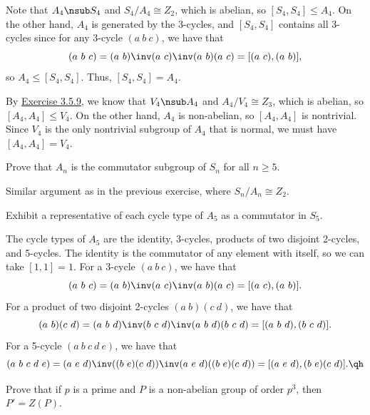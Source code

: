 \begin{sol}
    Note that $A_4 \nsub S_4$ and $S_4/A_4 \cong Z_2$, which is abelian, so $[S_4, S_4] \leq A_4$. On the other hand, $A_4$ is generated by the 3-cycles, and $[S_4, S_4]$ contains all 3-cycles since for any 3-cycle $(a\ b\ c)$, we have that
    \[(a\ b\ c) = (a\ b)\inv (a\ c)\inv (a\ b) (a\ c) = [(a\ c), (a\ b)],\]
    so $A_4 \leq [S_4, S_4]$. Thus, $[S_4, S_4] = A_4$. 

    By \hyperref[ex3.5.9]{Exercise 3.5.9}, we know that $V_4 \nsub A_4$ and $A_4/V_4 \cong Z_3$, which is abelian, so $[A_4, A_4] \leq V_4$. On the other hand, $A_4$ is non-abelian, so $[A_4, A_4]$ is nontrivial. Since $V_4$ is the only nontrivial subgroup of $A_4$ that is normal, we must have $[A_4, A_4] = V_4$. \qh
\end{sol}

\begin{exercise}\label{ex5.4.5}
    Prove that $A_n$ is the commutator subgroup of $S_n$ for all $n \geq 5$.
\end{exercise}

\begin{sol}
    Similar argument as in the previous exercise, where $S_n/A_n \cong Z_2$.
\end{sol}

\newpage

\begin{exercise}\label{ex5.4.6}
    Exhibit a representative of each cycle type of $A_5$ as a commutator in $S_5$.
\end{exercise}

\begin{sol}
    The cycle types of $A_5$ are the identity, 3-cycles, products of two disjoint 2-cycles, and 5-cycles. The identity is the commutator of any element with itself, so we can take $[1, 1] = 1$. For a 3-cycle $(a\ b\ c)$, we have that
    \[(a\ b\ c) = (a\ b)\inv (a\ c)\inv (a\ b) (a\ c) = [(a\ c), (a\ b)].\]
    For a product of two disjoint 2-cycles $(a\ b)(c\ d)$, we have that
    \[(a\ b)(c\ d) = (a\ b\ d)\inv (b\ c\ d)\inv (a\ b\ d) (b\ c\ d) = [(a\ b\ d), (b\ c\ d)].\]
    For a 5-cycle $(a\ b\ c\ d\ e)$, we have that
    \[(a\ b\ c\ d\ e) = (a\ e\ d)\inv ((b\ e)(c\ d))\inv (a\ e\ d) ((b\ e)(c\ d)) = [(a\ e\ d), (b\ e)(c\ d)]. \qh\]
\end{sol}

\begin{exercise}\label{ex5.4.7}
    Prove that if $p$ is a prime and $P$ is a non-abelian group of order $p^3$, then $P' = Z(P)$.
\end{exercise}

